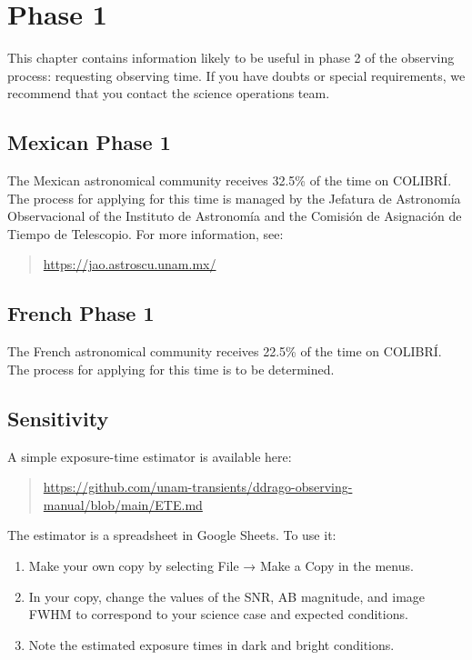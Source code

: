 \chapter{Phase 1}
\label{chapter:phase-1}

This chapter contains information likely to be useful in phase 2 of the observing process: requesting observing time. If you have doubts or special requirements, we recommend that you contact the science operations team.

\section{Mexican Phase 1}

The Mexican astronomical community receives 32.5\% of the time on COLIBRÍ. The process for applying for this time is managed by the Jefatura de Astronomía Observacional of the Instituto de Astronomía and the Comisión de Asignación de Tiempo de Telescopio. For more information, see:

\begin{quote}
\url{https://jao.astroscu.unam.mx/}
\end{quote}

\section{French Phase 1}

The French astronomical community receives 22.5\% of the time on COLIBRÍ. The process for applying for this time is to be determined.

\section{Sensitivity}

A simple exposure-time estimator is available here:

\begin{quote}
\url{https://github.com/unam-transients/ddrago-observing-manual/blob/main/ETE.md}
\end{quote}

The estimator is a spreadsheet in Google Sheets. To use it:
\begin{enumerate}
\item 
Make your own copy by selecting File → Make a Copy in the menus.
\item
In your copy, change the values of the SNR, AB magnitude, and image FWHM to correspond to your science case and expected conditions.
\item 
Note the estimated exposure times in dark and bright conditions.
\end{enumerate}

